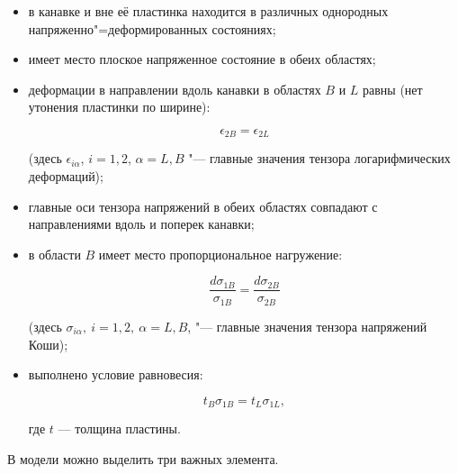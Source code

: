 \begin{itemize} 

\item[а)] в канавке и вне её пластинка находится в различных однородных напряженно"=деформированных состояниях;

\item[б)] имеет место плоское напряженное состояние в обеих областях;

\item[в)] деформации в направлении вдоль канавки в областях $B$ и $L$ равны (нет утонения пластинки по ширине): 

\begin{equation}

	\epsilon_{2B}=\epsilon_{2L}

\end{equation}

(здесь $\epsilon_{i\alpha}$, $i=1,2$, $\alpha=L,B$ "--- главные значения тензора логарифмических деформаций);

\item[г)] главные оси тензора напряжений в обеих областях совпадают с направлениями вдоль и поперек канавки;

\item[д)] в области $B$ имеет место пропорциональное нагружение:

\begin{equation}

\frac{d\sigma_{1B}}{\sigma_{1B}} = \frac{d\sigma_{2B}}{\sigma_{2B}}

\end{equation}

(здесь $\sigma_{i\alpha},\ i=1,2,\ \alpha=L,B$, "--- главные значения тензора напряжений Коши);

\item[е)] выполнено условие равновесия:

\begin{equation}\label{keller:eq:113}

t_B \sigma_{1B} = t_L \sigma_{1L},

\end{equation} 

где $t$ --- толщина пластины.

\end{itemize}







В модели можно выделить три важных элемента.

